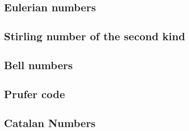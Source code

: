 	\subsection{Eulerian numbers}
		
	\subsection{Stirling number of the second kind}
		
	
	\subsection{Bell numbers}
		
	
	\subsection{Prufer code}
		

	\subsection{Catalan Numbers}
		